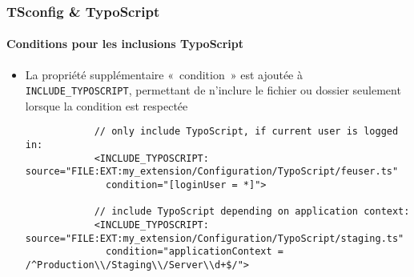 \begin{frame}[fragile]
	\frametitle{TSconfig \& TypoScript}
	\framesubtitle{Conditions pour les inclusions TypoScript}

	\lstset{basicstyle=\tiny\ttfamily}

	\begin{itemize}

		\item La propriété supplémentaire «~condition~» est ajoutée à \texttt{INCLUDE\_TYPOSCRIPT}, permettant
			de n'inclure le fichier ou dossier seulement lorsque la condition est respectée

		\begin{lstlisting}
			// only include TypoScript, if current user is logged in:
			<INCLUDE_TYPOSCRIPT: source="FILE:EXT:my_extension/Configuration/TypoScript/feuser.ts"
			  condition="[loginUser = *]">

			// include TypoScript depending on application context:
			<INCLUDE_TYPOSCRIPT: source="FILE:EXT:my_extension/Configuration/TypoScript/staging.ts"
			  condition="applicationContext = /^Production\\/Staging\\/Server\\d+$/">
		\end{lstlisting}

	\end{itemize}

\end{frame}

